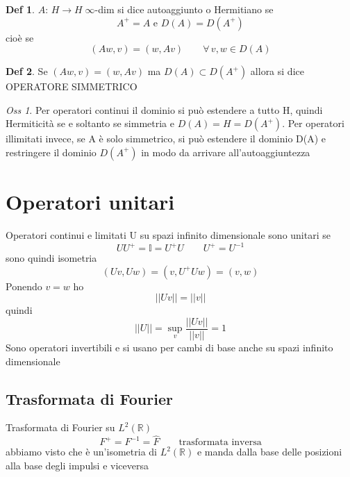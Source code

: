 \documentclass[a4paper,11pt]{report}
\theoremstyle{remark}
\newtheorem*{oss}{Oss}
\theoremstyle{definition}
\newtheorem*{Def}{Def}
\newcommand{\R}{\mathbb{R}}
\begin{document}
\begin{Def}
	$A: \, H\to H \; \infty$-dim si dice autoaggiunto o Hermitiano se 
	\begin{equation*}
		A^+ = A \text{ e } D(A) = D(A^+)
	\end{equation*} 
	cioè se 
	\begin{equation*}
		(Aw, v) = (w, Av) \qquad \forall \, v,w \in D(A)
	\end{equation*}
\end{Def}
\begin{Def}
	Se $(Aw, v) = (w, Av)$ ma $D(A) \subset D(A^+)$ allora si dice OPERATORE SIMMETRICO
\end{Def}
\begin{oss}
	Per operatori continui il dominio si può estendere a tutto H, quindi Hermiticità se e soltanto se simmetria e $D(A) = H = D(A^+)$. Per operatori illimitati invece, se A è solo simmetrico, si può estendere il dominio D(A) e restringere il dominio $D(A^+)$ in modo da arrivare all'autoaggiuntezza
\end{oss}

\section{Operatori unitari}
Operatori continui e limitati U su spazi infinito dimensionale sono unitari se 
\begin{equation*}
	UU^+= \mathbb{I} = U^+U \qquad U^+ = U^{-1}
\end{equation*}
sono quindi isometria
\begin{equation*}
	(Uv, Uw) = (v, U^+Uw) = (v,w)
\end{equation*}
Ponendo $v = w$ ho 
\begin{equation*}
	||Uv|| = ||v||
\end{equation*} 
quindi
\begin{equation*}
	||U|| = \sup_v \frac{||Uv||}{||v||} = 1
\end{equation*}
Sono operatori invertibili e si usano per cambi di base anche su spazi infinito dimensionale

\subsection*{Trasformata di Fourier}
Trasformata di Fourier su $L^2(\R)$
\begin{equation*}
	F^+ = F^{-1} = \hat{F} \qquad \text{trasformata inversa}
\end{equation*}
abbiamo visto che è un'isometria di $L^2(\R)$ e manda dalla base delle posizioni alla base degli impulsi e viceversa
\end{document}
